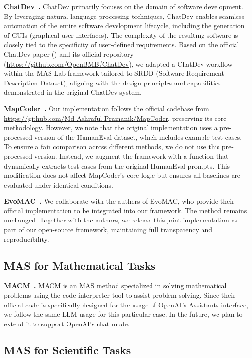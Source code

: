\documentclass{article}
\begin{document}
\textbf{ChatDev~\cite{qian2024chatdev}.}
ChatDev primarily focuses on the domain of software development.
By leveraging natural language processing techniques, ChatDev enables seamless automation of the entire software development lifecycle, including the generation of GUIs (graphical user interfaces). 
The complexity of the resulting software is closely tied to the specificity of user-defined requirements.
Based on the official ChatDev paper (\cite{qian2024chatdev})  and its official repository (\url{https://github.com/OpenBMB/ChatDev}), we adapted a ChatDev workflow within the MAS-Lab framework tailored to SRDD (Software Requirement Description Dataset), aligning with the design principles and capabilities demonstrated in the original ChatDev system.

\textbf{MapCoder~\cite{islam2024mapcoder}.}
Our implementation follows the official codebase from \url{https://github.com/Md-Ashraful-Pramanik/MapCoder}, preserving its core methodology.
However, we note that the original implementation uses a pre-processed version of the HumanEval dataset, which includes example test cases.
To ensure a fair comparison across different methods, we do not use this pre-processed version.
Instead, we augment the framework with a function that dynamically extracts test cases from the original HumanEval prompts.
This modification does not affect MapCoder's core logic but ensures all baselines are evaluated under identical conditions.

\textbf{EvoMAC~\cite{hu2025selfevolving}.}
We collaborate with the authors of EvoMAC, who provide their official implementation to be integrated into our framework.
The method remains unchanged. Together with the authors, we release this joint implementation as part of our open-source framework, maintaining full transparency and reproducibility.

\subsection{MAS for Mathematical Tasks}

\textbf{MACM~\cite{leimacm}.}  
MACM is an MAS method specialized in solving mathematical problems using the code interpreter tool to assist problem solving.
Since their official code is specifically designed for the usage of OpenAI's Assistants interface, we follow the same LLM usage for this particular case.
In the future, we plan to extend it to support OpenAI's chat mode.

\subsection{MAS for Scientific Tasks}
\end{document}

